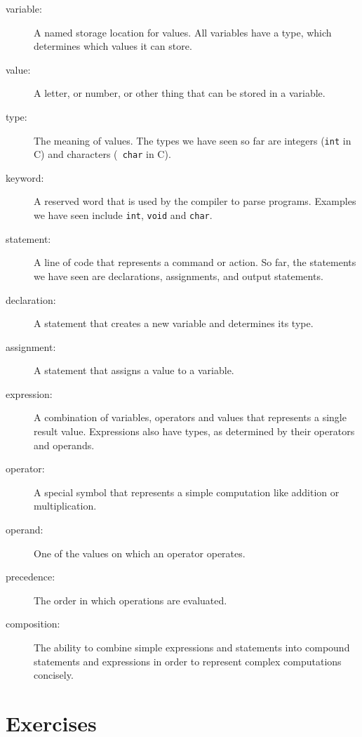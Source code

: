 \begin{description}

\item[variable:] A named storage location for values.  All
variables have a type, which determines which values it can
store.

\item[value:] A letter, or number, or other thing that can be
stored in a variable.  

\item[type:] The meaning of values.  The types
we have seen so far are integers ({\tt int} in C) and characters ({\tt
char} in C).

\item[keyword:]  A reserved word that is used by the compiler
to parse programs.  Examples we have seen include {\tt int},
{\tt void} and {\tt char}.

\item[statement:] A line of code that represents a command or
action.  So far, the statements we have seen are declarations,
assignments, and output statements.

\item[declaration:] A statement that creates a new variable and
determines its type.

\item[assignment:] A statement that assigns a value to a variable.

\item[expression:] A combination of variables, operators and
values that represents a single result value.  Expressions also
have types, as determined by their operators and operands.

\item[operator:] A special symbol that represents a simple
computation like addition or multiplication.

\item[operand:] One of the values on which an operator operates. 

\item[precedence:] The order in which operations are evaluated.

\item[composition:] The ability to combine simple
expressions and statements into compound statements and expressions
in order to represent complex computations concisely.


\end{description}


\section{Exercises}
\setcounter{exercisenum}{0}






